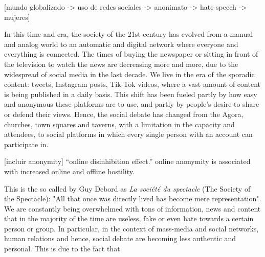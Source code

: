 
\color{red}[mundo globalizado -> uso de redes sociales -> anonimato -> hate speech -> mujeres]\color{black} \newline

In this time and era, the society of the 21st century has evolved from a manual and analog world to an automatic and digital network where everyone and everything is connected. The times of buying the newspaper or sitting in front of the television to watch the news are decreasing more and more, due to the widespread of social media in the last decade. We live in the era of the sporadic content: tweets, Instagram posts, Tik-Tok videos, where a vast amount of content is being published in a daily basis. This shift has been fueled partly by how easy and anonymous these platforms are to use, and partly by people's desire to share or defend their views. Hence, the social debate has changed from the Agora, churches, town squares and taverns, with a limitation in the capacity and attendees, to social platforms in which every single person with an account can participate in.


\color{red}[incluir anonymity]\color{black} \newline
“online disinhibition effect.” \cite{fox-2015}  online anonymity is associated with increased online and offline hostility.


This is the so called by Guy Debord as \textit{La société du spectacle} (The Society of the Spectacle): "All that once was directly lived has become mere representation". We are constantly being overwhelmed with tons of information, news and content that in the majority of the time are useless, fake or even hate towards a certain person or group. In particular, in the context of mass-media and social networks, human relations and hence, social debate are becoming less authentic and personal. This is due to the fact that 


